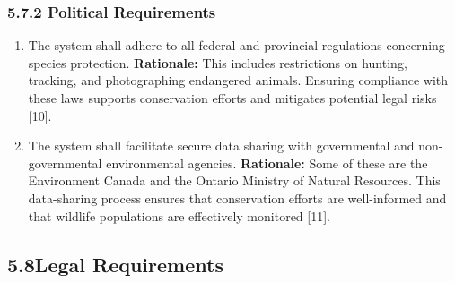 \documentclass[]{article}
\begin{document}
\subsubsection*{5.7.2 Political Requirements}
\label{ssub:political_requirements}
\begin{enumerate}[{CP-P}1. ]
	 \item The system shall adhere to all federal and provincial regulations concerning species protection. 
    \newline \textbf{Rationale:} This includes restrictions on hunting, tracking, and photographing endangered animals. Ensuring compliance with these laws supports conservation efforts and mitigates potential legal risks [10].

      \item The system shall facilitate secure data sharing with governmental and non-governmental environmental agencies.
    \newline \textbf{Rationale:} Some of these are the Environment Canada and the Ontario Ministry of Natural Resources. This data-sharing process ensures that conservation efforts are well-informed and that wildlife populations are effectively monitored [11].
\end{enumerate}


\subsection*{5.8Legal Requirements}
\label{sub:legal_requirements}
\end{document}
